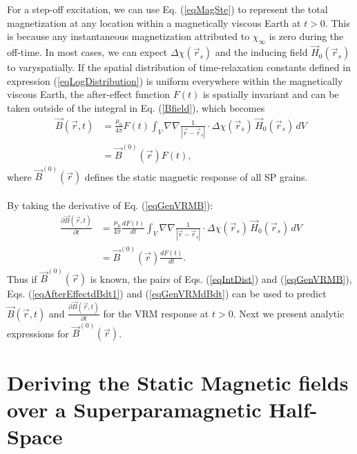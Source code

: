 \documentclass[onecolumn]{IEEEtran} %
\begin{document}
For a step-off excitation, we can use Eq. (\ref{eqMagSte})  to represent the total magnetization at any location within a magnetically viscous Earth at $t > 0$. This is because any instantaneous magnetization attributed to $\chi_\infty$ is zero during the off-time. In most cases, we can expect $\Delta \chi(\vec r_s)$ and the inducing field $\vec H_0(\vec r_s)$ to varyspatially. If the spatial distribution of time-relaxation constants defined in expression (\ref{eqLogDistribution}) is uniform everywhere within the magnetically viscous Earth, the after-effect function $F(t)$ is spatially invariant and can be taken outside of the integral in Eq. (\ref{Bfield}), which becomes
\begin{align}
\vec B(\vec r,t) &= \frac{\mu_0}{4 \pi} F(t) \int_V \nabla \nabla \frac{1}{| \vec r - \vec r_s |} \cdot \Delta \chi(\vec r_s) \, \vec H_0(\vec r_s) \, dV \nonumber \\
&= \vec B^{(0)} (\vec r) F(t),
\label{eqGenVRMB}
\end{align}
where $\vec B^{(0)}(\vec r)$ defines  the static magnetic response of all SP grains.
\\\\
By taking the derivative of Eq. (\ref{eqGenVRMB}):
\begin{align}
\frac{\partial \vec B(\vec r,t)}{\partial t} &= \frac{\mu_0}{4 \pi} \frac{d F(t)}{dt} \int_V \nabla \nabla \frac{1}{| \vec r - \vec r_s |} \cdot \Delta \chi(\vec r_s) \, \vec H_0(\vec r_s) \, dV \nonumber \\
&= \vec B^{(0)} (\vec r) \frac{d F(t)}{dt}.
\label{eqGenVRMdBdt}
\end{align}
Thus if $\vec B^{(0)}(\vec r)$ is known, the pairs of Eqs. (\ref{eqIntDist}) and (\ref{eqGenVRMB}), Eqs. (\ref{eqAfterEffectdBdt1}) and (\ref{eqGenVRMdBdt}) can be used to predict $\vec B(\vec r,t)$ and $\frac{\partial \vec B(\vec r,t)}{\partial t}$ for the VRM response at $t > 0$. Next we present analytic expressions for $\vec B^{(0)} (\vec r)$.


\section{Deriving the Static Magnetic fields over a Superparamagnetic Half-Space}
\label{secMagnetostatic}
\end{document}
